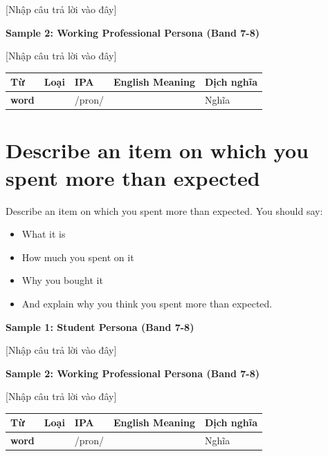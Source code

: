 [Nhập câu trả lời vào đây]

\textbf{Sample 2: Working Professional Persona (Band 7-8)}

[Nhập câu trả lời vào đây]

\separator


\vspace{0.8em}
\begin{center}
\renewcommand{\arraystretch}{1.65}
\begin{tabularx}{\textwidth}{|V{0.22\textwidth}|C{0.07\textwidth}|I{0.20\textwidth}|Y|V{0.18\textwidth}|}
\hline
{}
\textbf{Từ} & \textbf{Loại} & \textbf{IPA} & \textbf{English Meaning} & \textbf{Dịch nghĩa} \\
\hline
\textbf{word} & & /pron/ & & Nghĩa \\ \hline
\end{tabularx}
\end{center}

\newpage

\section{Describe an item on which you spent more than expected}
\begin{ieltsprompt}
Describe an item on which you spent more than expected.
You should say:
\begin{itemize}[leftmargin=2em, itemsep=2pt]
\item What it is
\item How much you spent on it
\item Why you bought it
\item And explain why you think you spent more than expected.
\end{itemize}
\end{ieltsprompt}
\begin{ieltsanswer}
\textbf{Sample 1: Student Persona (Band 7-8)}

[Nhập câu trả lời vào đây]

\textbf{Sample 2: Working Professional Persona (Band 7-8)}

[Nhập câu trả lời vào đây]
\end{ieltsanswer}


\vspace{0.8em}
\begin{center}
\renewcommand{\arraystretch}{1.65}
\begin{tabularx}{\textwidth}{|V{0.22\textwidth}|C{0.07\textwidth}|I{0.20\textwidth}|Y|V{0.18\textwidth}|}
\hline
{}
\textbf{Từ} & \textbf{Loại} & \textbf{IPA} & \textbf{English Meaning} & \textbf{Dịch nghĩa} \\
\hline
\textbf{word} & & /pron/ & & Nghĩa \\ \hline
\end{tabularx}
\end{center}

